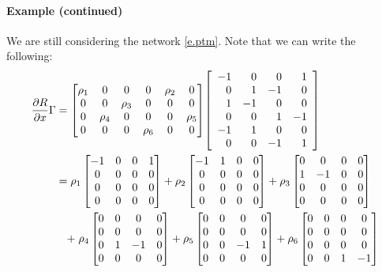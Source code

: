 \documentclass[onefignum,onetabnum]{siamonline220329}
\newcommand\mybox{}
\begin{document}
 
 \mybox{\paragraph{Example (continued)}  We are still considering the network \eqref{e.ptm}. Note that we can write the following:
 	\begin{align*}\frac{\partial R}{\partial x}\Gamma&= {%
    \begin{bmatrix}\rho_1 & 0 & 0 & 0 & \rho_2 & 0 \\ 0 & 0 & \rho_3 & 0 & 0 & 0 \\
 				0 & \rho_4 & 0 & 0 & 0 & \rho_5 \\ 0 & 0 &0 	& \rho_6 & 0 & 0 \end{bmatrix}}{%
                \left[\begin{array}{rrrr} -1 & 0 & 0 & 1 \\ 0 & 1 & -1 & 0 \\ 1 & -1 & 0 & 0 \\ 0 & 0 & 1 & -1 \\ -1 & 1 & 0 & 0 \\ 0 & 0 & -1& 1 \end{array}\right]} \\  &= {%
                \rho_1\begin{bmatrix} -1 & 0 &0 & 1 \\ 0 & 0 & 0 & 0 \\ 0 & 0 & 0 & 0 \\  0 & 0 & 0 & 0 \end{bmatrix}+\rho_2 \begin{bmatrix} -1 & 1 & 0 & 0 \\ 0 & 0 & 0 & 0 \\ 0 & 0 & 0 & 0 \\  0 & 0 & 0 & 0 \end{bmatrix} + \rho_3 \begin{bmatrix} 0 & 0 & 0 & 0 \\ 1 & -1 & 0 & 0 \\ 0 & 0 & 0 & 0 \\  0 & 0 & 0 & 0 \end{bmatrix} } \\ & { %
                \quad + \; \rho_4 \begin{bmatrix} 0 & 0 & 0 & 0 \\ 0 & 0 & 0 & 0 \\ 0 & 1 & -1 & 0 \\  0 & 0 & 0 & 0 \end{bmatrix} +\rho_5 \begin{bmatrix} 0 & 0 & 0 & 0 \\ 0 & 0 & 0 & 0 \\  0 & 0 & -1 & 1  \\  0 & 0 & 0 & 0 \end{bmatrix}  +\rho_6  \begin{bmatrix} 0 & 0 & 0 & 0 \\ 0 & 0 & 0 & 0 \\    0 & 0 & 0 & 0 \\ 0 & 0 & 1 & -1  \end{bmatrix} } \\

\end{align*}}
\end{document}
